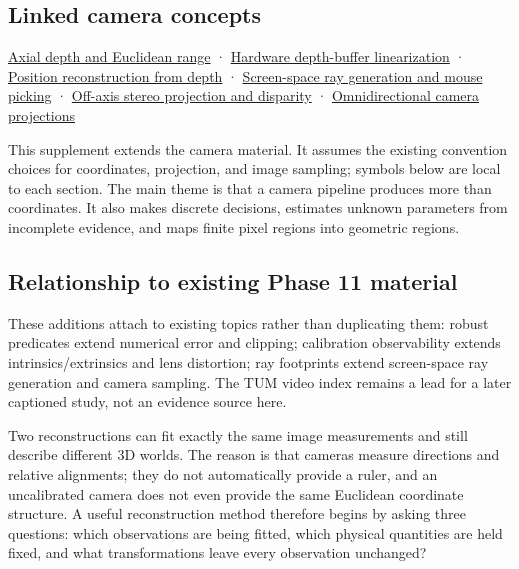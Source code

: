 \subsection{Linked camera concepts}\label{02-foundations-ii-ch039-linked-camera-concepts}

\hyperref[02-foundations-ii-ch035-recover-geometry-from-depth-and-construct-screen-space-rays]{Axial depth and Euclidean range} · \hyperref[02-foundations-ii-ch035-recover-geometry-from-depth-and-construct-screen-space-rays]{Hardware depth-buffer linearization} · \hyperref[02-foundations-ii-ch035-recover-geometry-from-depth-and-construct-screen-space-rays]{Position reconstruction from depth} · \hyperref[02-foundations-ii-ch035-recover-geometry-from-depth-and-construct-screen-space-rays]{Screen-space ray generation and mouse picking} · \hyperref[02-foundations-ii-ch035-build-projection-and-stereo-geometry-around-real-camera-baselines]{Off-axis stereo projection and disparity} · \hyperref[02-foundations-ii-ch035-represent-directions-over-the-full-sphere]{Omnidirectional camera projections}

This supplement extends the camera material. It assumes the existing convention choices for coordinates, projection, and image sampling; symbols below are local to each section. The main theme is that a camera pipeline produces more than coordinates. It also makes discrete decisions, estimates unknown parameters from incomplete evidence, and maps finite pixel regions into geometric regions.

\subsection{Relationship to existing Phase 11 material}\label{02-foundations-ii-ch039-relationship-to-existing-phase-11-material}

These additions attach to existing topics rather than duplicating them: robust predicates extend numerical error and clipping; calibration observability extends intrinsics/extrinsics and lens distortion; ray footprints extend screen-space ray generation and camera sampling. The TUM video index remains a lead for a later captioned study, not an evidence source here.

Two reconstructions can fit exactly the same image measurements and still describe different 3D worlds. The reason is that cameras measure directions and relative alignments; they do not automatically provide a ruler, and an uncalibrated camera does not even provide the same Euclidean coordinate structure. A useful reconstruction method therefore begins by asking three questions: which observations are being fitted, which physical quantities are held fixed, and what transformations leave every observation unchanged?

